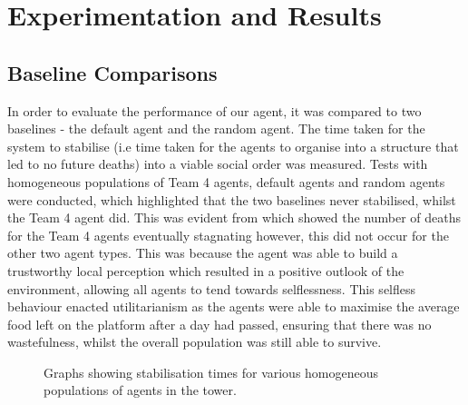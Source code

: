 \section{Experimentation and Results}

\subsection{Baseline Comparisons}
In order to evaluate the performance of our agent, it was compared to two baselines - the default agent and the random agent. The time taken for the system to stabilise (i.e time taken for the agents to organise into a structure that led to no future deaths) into a viable social order was measured. Tests with homogeneous populations of Team 4 agents, default agents and random agents were conducted, which highlighted that the two baselines never stabilised, whilst the Team 4 agent did. This was evident from  which showed the number of deaths for the Team 4 agents eventually stagnating however, this did not occur for the other two agent types. This was because the agent was able to build a trustworthy local perception which resulted in a positive outlook of the environment, allowing all agents to tend towards selflessness. This selfless behaviour enacted utilitarianism as the agents were able to maximise the average food left on the platform after a day had passed, ensuring that there was no wastefulness, whilst the overall population was still able to survive. 

\begin{figure}[htb]%
    \centering
    \qquad
    \qquad
    \caption{Graphs showing stabilisation times for various homogeneous populations of agents in the tower.}%
    \label{fig:baselinecomps}%
\end{figure}

